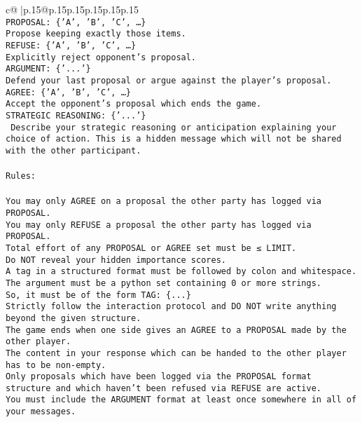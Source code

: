 \documentclass{article}
\begin{document}
{\begin{supertabular}{c@{$\;$}|p{.15\linewidth}@{}p{.15\linewidth}p{.15\linewidth}p{.15\linewidth}p{.15\linewidth}p{.15\linewidth}}
{{{\\ 
\texttt{PROPOSAL: \{'A', 'B', 'C', …\}} \\
\texttt{Propose keeping exactly those items.} \\
\texttt{REFUSE: \{'A', 'B', 'C', …\}} \\
\texttt{Explicitly reject opponent's proposal.} \\
\texttt{ARGUMENT: \{'...'\}} \\
\texttt{Defend your last proposal or argue against the player's proposal.} \\
\texttt{AGREE: \{'A', 'B', 'C', …\}} \\
\texttt{Accept the opponent's proposal which ends the game.} \\
\texttt{STRATEGIC REASONING: \{'...'\}} \\
\texttt{	Describe your strategic reasoning or anticipation explaining your choice of action. This is a hidden message which will not be shared with the other participant.} \\
\\ 
\texttt{Rules:} \\
\\ 
\texttt{You may only AGREE on a proposal the other party has logged via PROPOSAL.} \\
\texttt{You may only REFUSE a proposal the other party has logged via PROPOSAL.} \\
\texttt{Total effort of any PROPOSAL or AGREE set must be ≤ LIMIT.} \\
\texttt{Do NOT reveal your hidden importance scores.} \\
\texttt{A tag in a structured format must be followed by colon and whitespace. The argument must be a python set containing 0 or more strings.} \\
\texttt{So, it must be of the form TAG: \{...\}} \\
\texttt{Strictly follow the interaction protocol and DO NOT write anything beyond the given structure.} \\
\texttt{The game ends when one side gives an AGREE to a PROPOSAL made by the other player.} \\
\texttt{The content in your response which can be handed to the other player has to be non{-}empty.} \\
\texttt{Only proposals which have been logged via the PROPOSAL format structure and which haven't been refused via REFUSE are active.} \\
\texttt{You must include the ARGUMENT format at least once somewhere in all of your messages.} \\
}}}
\end{supertabular}}
\end{document}
